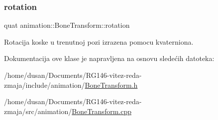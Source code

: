 \mbox{\label{classanimation_1_1BoneTransform_a3e8c723b186841dcc21d5548944d243b}} 
\subsubsection{\texorpdfstring{rotation}{rotation}}
{\footnotesize\ttfamily quat animation\+::\+Bone\+Transform\+::rotation\hspace{0.3cm}{\ttfamily [private]}}



Rotacija koske u trenutnoj pozi izrazena pomocu kvaterniona. 



Dokumentacija ove klase je napravljena na osnovu sledećih datoteka\+:\begin{DoxyCompactItemize}
\item 
/home/dusan/\+Documents/\+R\+G146-\/vitez-\/reda-\/zmaja/include/animation/\hyperlink{BoneTransform_8h}{Bone\+Transform.\+h}\item 
/home/dusan/\+Documents/\+R\+G146-\/vitez-\/reda-\/zmaja/src/animation/\hyperlink{BoneTransform_8cpp}{Bone\+Transform.\+cpp}\end{DoxyCompactItemize}
